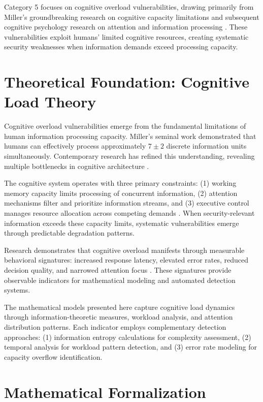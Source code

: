 \documentclass[11pt,a4paper]{article}
\begin{document}
Category 5 focuses on cognitive overload vulnerabilities, drawing primarily from Miller's groundbreaking research on cognitive capacity limitations \cite{miller1956} and subsequent cognitive psychology research on attention and information processing \cite{kahneman1973}. These vulnerabilities exploit humans' limited cognitive resources, creating systematic security weaknesses when information demands exceed processing capacity.

\section{Theoretical Foundation: Cognitive Load Theory}

Cognitive overload vulnerabilities emerge from the fundamental limitations of human information processing capacity. Miller's \cite{miller1956} seminal work demonstrated that humans can effectively process approximately $7 \pm 2$ discrete information units simultaneously. Contemporary research has refined this understanding, revealing multiple bottlenecks in cognitive architecture \cite{baddeley1992}.

The cognitive system operates with three primary constraints: (1) working memory capacity limits processing of concurrent information, (2) attention mechanisms filter and prioritize information streams, and (3) executive control manages resource allocation across competing demands \cite{miyake2000}. When security-relevant information exceeds these capacity limits, systematic vulnerabilities emerge through predictable degradation patterns.

Research demonstrates that cognitive overload manifests through measurable behavioral signatures: increased response latency, elevated error rates, reduced decision quality, and narrowed attention focus \cite{sweller1988}. These signatures provide observable indicators for mathematical modeling and automated detection systems.

The mathematical models presented here capture cognitive load dynamics through information-theoretic measures, workload analysis, and attention distribution patterns. Each indicator employs complementary detection approaches: (1) information entropy calculations for complexity assessment, (2) temporal analysis for workload pattern detection, and (3) error rate modeling for capacity overflow identification.

\section{Mathematical Formalization}
\end{document}

